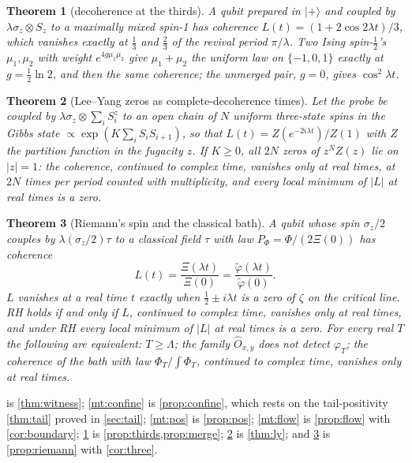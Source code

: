 \documentclass[11pt]{article}
\newtheorem{theorem}{Theorem}[section]
\theoremstyle{definition}\newtheorem{definition}[theorem]{Definition}
\theoremstyle{remark}\newtheorem{remark}[theorem]{Remark}
\begin{document}
\begin{theorem}[decoherence at the thirds]\label{mt:thirds}
A qubit prepared in $|+\rangle$ and coupled by $\lambda\sigma_z\otimes S_z$ to a maximally mixed spin-1 has coherence $L(t)=(1+2\cos2\lambda t)/3$, which vanishes exactly at $\frac13$ and $\frac23$ of the revival period $\pi/\lambda$. Two Ising spin-$\frac12$'s $\mu_1,\mu_2$ with weight $e^{4g\mu_1\mu_2}$ give $\mu_1+\mu_2$ the uniform law on $\{-1,0,1\}$ exactly at $g=\frac12\ln2$, and then the same coherence; the unmerged pair, $g=0$, gives $\cos^2\lambda t$.
\end{theorem}

\begin{theorem}[Lee--Yang zeros as complete-decoherence times]\label{mt:ly}
Let the probe be coupled by $\lambda\sigma_z\otimes\sum_iS_i^z$ to an open chain of $N$ uniform three-state spins in the Gibbs state $\propto\exp(K\sum_iS_iS_{i+1})$, so that $L(t)=Z(e^{-2i\lambda t})/Z(1)$ with $Z$ the partition function in the fugacity $z$. If $K\ge0$, all $2N$ zeros of $z^NZ(z)$ lie on $|z|=1$: the coherence, continued to complex time, vanishes only at real times, at $2N$ times per period counted with multiplicity, and every local minimum of $|L|$ at real times is a zero.
\end{theorem}

\begin{theorem}[Riemann's spin and the classical bath]\label{mt:riemann}
A qubit whose spin $\sigma_z/2$ couples by $\lambda(\sigma_z/2)\tau$ to a classical field $\tau$ with law $P_\Phi=\Phi/(2\Xi(0))$ has coherence
\[
L(t)=\frac{\Xi(\lambda t)}{\Xi(0)}=\frac{\tilde\varphi(\lambda t)}{\tilde\varphi(0)} .
\]
$L$ vanishes at a real time $t$ exactly when $\frac12\pm i\lambda t$ is a zero of $\zeta$ on the critical line. RH holds if and only if $L$, continued to complex time, vanishes only at real times, and under RH every local minimum of $|L|$ at real times is a zero. For every real $T$ the following are equivalent: $T\ge\Lambda$; the family $\hat O_{x,y}$ does not detect $\varphi_T$; the coherence of the bath with law $\Phi_T/\int\Phi_T$, continued to complex time, vanishes only at real times.
\end{theorem}

 is \cref{thm:witness}; \cref{mt:confine} is \cref{prop:confine}, which rests on the tail-positivity \cref{thm:tail} proved in \cref{sec:tail}; \cref{mt:pos} is \cref{prop:pos}; \cref{mt:flow} is \cref{prop:flow} with \cref{cor:boundary}; \cref{mt:thirds} is \cref{prop:thirds,prop:merge}; \cref{mt:ly} is \cref{thm:ly}; and \cref{mt:riemann} is \cref{prop:riemann} with \cref{cor:three}.
\end{document}
